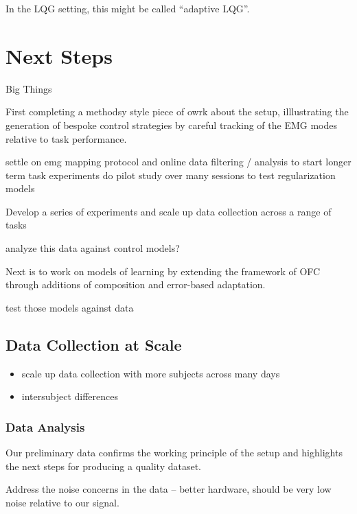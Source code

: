 \documentclass[
  a4paper,
]{article}
\providecommand{\tightlist}{%
  \setlength{\itemsep}{0pt}\setlength{\parskip}{0pt}}
\begin{document}
In the LQG setting, this might be called ``adaptive LQG''.

\hypertarget{next-steps}{%
\section{Next Steps}\label{next-steps}}

Big Things

First completing a methodsy style piece of owrk about the setup,
illlustrating the generation of bespoke control strategies by careful
tracking of the EMG modes relative to task performance.

settle on emg mapping protocol and online data filtering / analysis to
start longer term task experiments do pilot study over many sessions to
test regularization models

Develop a series of experiments and scale up data collection across a
range of tasks

analyze this data against control models?

Next is to work on models of learning by extending the framework of OFC
through additions of composition and error-based adaptation.

test those models against data

\hypertarget{data-collection-at-scale}{%
\subsection{Data Collection at Scale}\label{data-collection-at-scale}}

\begin{itemize}
\tightlist
\item
  scale up data collection with more subjects across many days
\item
  intersubject differences
\end{itemize}

\hypertarget{data-analysis}{%
\subsubsection{Data Analysis}\label{data-analysis}}

Our preliminary data confirms the working principle of the setup and
highlights the next steps for producing a quality dataset.

Address the noise concerns in the data -- better hardware, should be
very low noise relative to our signal.
\end{document}
